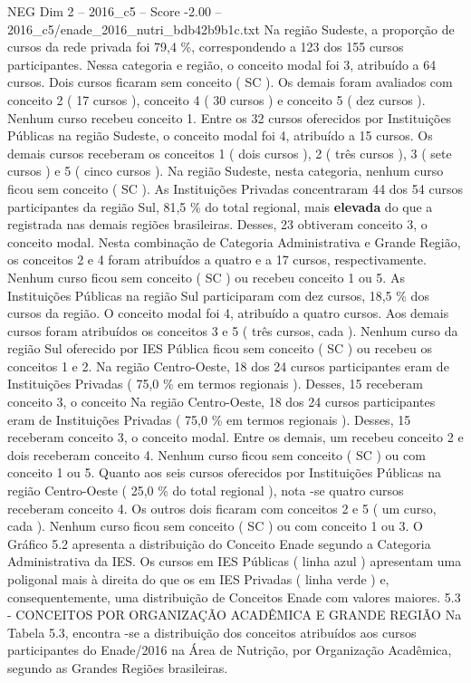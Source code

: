 \begin{textsample}{NEG Dim 2 – 2016\_c5 – Score -2.00 – 2016\_c5/enade\_2016\_nutri\_bdb42b9b1c.txt}
Na região Sudeste, a proporção de cursos da rede privada foi 79,4 \%, correspondendo a 123 dos 155 cursos participantes.
Nessa categoria e região, o conceito modal foi 3, atribuído a 64 cursos.
Dois cursos ficaram sem conceito ( SC ).
Os demais foram avaliados com conceito 2 ( 17 cursos ), conceito 4 ( 30 cursos ) e conceito 5 ( dez cursos ).
Nenhum curso recebeu conceito 1.
Entre os 32 cursos oferecidos por Instituições Públicas na região Sudeste, o conceito modal foi 4, atribuído a 15 cursos.
Os demais cursos receberam os conceitos 1 ( dois cursos ), 2 ( três cursos ), 3 ( sete cursos ) e 5 ( cinco cursos ).
Na região Sudeste, nesta categoria, nenhum curso ficou sem conceito ( SC ).
As Instituições Privadas concentraram 44 dos 54 cursos participantes da região Sul, 81,5 \% do total regional, mais \textbf{elevada} do que a registrada nas demais regiões brasileiras.
Desses, 23 obtiveram conceito 3, o conceito modal.
Nesta combinação de Categoria Administrativa e Grande Região, os conceitos 2 e 4 foram atribuídos a quatro e a 17 cursos, respectivamente.
Nenhum curso ficou sem conceito ( SC ) ou recebeu conceito 1 ou 5.
As Instituições Públicas na região Sul participaram com dez cursos, 18,5 \% dos cursos da região.
O conceito modal foi 4, atribuído a quatro cursos.
Aos demais cursos foram atribuídos os conceitos 3 e 5 ( três cursos, cada ).
Nenhum curso da região Sul oferecido por IES Pública ficou sem conceito ( SC ) ou recebeu os conceitos 1 e 2.
Na região Centro-Oeste, 18 dos 24 cursos participantes eram de Instituições Privadas ( 75,0 \% em termos regionais ).
Desses, 15 receberam conceito 3, o conceito Na região Centro-Oeste, 18 dos 24 cursos participantes eram de Instituições Privadas ( 75,0 \% em termos regionais ).
Desses, 15 receberam conceito 3, o conceito modal.
Entre os demais, um recebeu conceito 2 e dois receberam conceito 4.
Nenhum curso ficou sem conceito ( SC ) ou com conceito 1 ou 5.
Quanto aos seis cursos oferecidos por Instituições Públicas na região Centro-Oeste ( 25,0 \% do total regional ), nota -se quatro cursos receberam conceito 4.
Os outros dois ficaram com conceitos 2 e 5 ( um curso, cada ).
Nenhum curso ficou sem conceito ( SC ) ou com conceito 1 ou 3.
O Gráfico 5.2 apresenta a distribuição do Conceito Enade segundo a Categoria Administrativa da IES.
Os cursos em IES Públicas ( linha azul ) apresentam uma poligonal mais à direita do que os em IES Privadas ( linha verde ) e, consequentemente, uma distribuição de Conceitos Enade com valores maiores. 5.3 - CONCEITOS POR ORGANIZAÇÃO ACADÊMICA E GRANDE REGIÃO Na Tabela 5.3, encontra -se a distribuição dos conceitos atribuídos aos cursos participantes do Enade/2016 na Área de Nutrição, por Organização Acadêmica, segundo as Grandes Regiões brasileiras.

\end{textsample}
